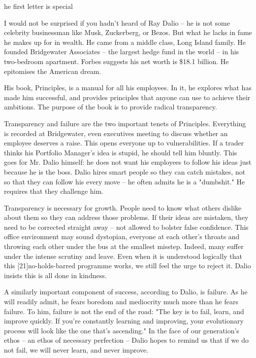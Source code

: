 \label{ch:principles}

he first letter is special



   I would not be surprised if you hadn't heard of Ray Dalio -- he is not
   some celebrity businessman like Musk, Zuckerberg, or Bezos. But what he
   lacks in fame he makes up for in wealth. He came from a middle
   class, Long Island family. He founded Bridgewater Associates -- the
   largest hedge fund in the world -- in his two-bedroom apartment. Forbes
   suggests his net worth is \$18.1 billion. He epitomises the American
   dream.

   His book, Principles, is a manual for all his employees. In it, he
   explores what has made him successful, and provides principles that
   anyone can use to achieve their ambitions. The
   purpose of the book is to provide radical transparency.

   Transparency and failure are the two important tenets of Principles.
   Everything is recorded at Bridgewater, even executives meeting to
   discuss whether an employee deserves a raise. This opens everyone up
   to vulnerabilities. If a trader thinks his Portfolio Manager's idea is
   stupid, he should tell him bluntly. This goes for Mr. Dalio himself: he
   does not want his employees to follow his ideas just because he is the
   boss. Dalio hires smart people so they can catch mistakes, not so that
   they can follow his every move -- he often admits he is a "dumbshit."
   He requires that they challenge him.

   Transparency is necessary for growth. People need to know what others
   dislike about them so they can address those problems. If their ideas
   are mistaken, they need to be corrected straight away -- not allowed to
   bolster false confidence. This office environment may sound dystopian,
   everyone at each other's throats and throwing each other under the bus
   at the smallest misstep. Indeed, many suffer under the intense scrutiny
   and leave. Even when it is understood logically that this
   [21]no-holds-barred programme works, we still feel the urge to reject
   it. Dalio insists this is all done in kindness.

   A similarly important component of success, according to Dalio, is
   failure. As he will readily admit, he fears boredom and mediocrity much
   more than he fears failure. To him, failure is not the end of the road:
   "The key is to fail, learn, and improve quickly. If you're constantly
   learning and improving, your evolutionary process will look like the
   one that's ascending." In the face of our generation's ethos -- an
   ethos of necessary perfection -- Dalio hopes to remind us that if we do
   not fail, we will never learn, and never improve.

